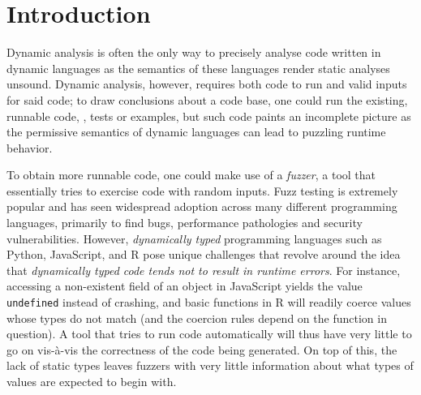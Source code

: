 \documentclass[sigplan,anonymous,review]{acmart}
\begin{document}
\begin{abstract}

\end{abstract}

\maketitle

\section{Introduction}
\label{sec:introduction}

Dynamic analysis is often the only way to precisely analyse code written in dynamic languages as the semantics of these languages render static analyses unsound. 
Dynamic analysis, however, requires both code to run and valid inputs for said code; to draw conclusions about a code base, one could run the existing, runnable code, \Eg, tests or examples, but such code paints an incomplete picture as the permissive semantics of dynamic languages can lead to puzzling runtime behavior.

To obtain more runnable code, one could make use of a \textit{fuzzer}, a tool that essentially tries to exercise code with random inputs. 
Fuzz testing is extremely popular and has seen widespread adoption across many different programming languages, primarily to find bugs, performance pathologies and security vulnerabilities.
However, \textit{dynamically typed} programming languages such as Python, JavaScript, and R pose unique challenges that revolve around the idea that \textit{dynamically typed code tends not to result in runtime errors}.
For instance, accessing a non-existent field of an object in JavaScript yields the value {\tt undefined} instead of crashing, and basic functions in R will readily coerce values whose types do not match (and the coercion rules depend on the function in question).
A tool that tries to run code automatically will thus have very little to go on vis-\`a-vis the correctness of the code being generated.
On top of this, the lack of static types leaves fuzzers with very little information about what types of values are expected to begin with.
\end{document}
